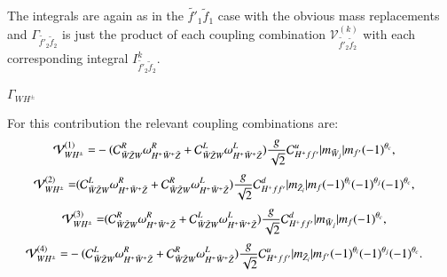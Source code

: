 \documentclass[final,3p,times,pdflatex]{elsarticle}
\begin{document}
The integrals are again as in the $\tilde{f'}_1 \tilde{f}_1$ case with the obvious mass replacements and $\Gamma_{\tilde{f'}_2 \tilde{f}_2}$ is just the product of each coupling combination $\mathcal{V}_{\tilde{f'}_2 \tilde{f}_2}^{(k)}$ with each corresponding integral $I_{\tilde{f'}_2 \tilde{f}_2}^{k}$.

\textbf{\underline{$\Gamma_{W H^{\pm}}$}}

For this contribution the relevant coupling combinations are:
\begin{equation}
\begin{aligned}
\mathcal{V}_{W H^{\pm}}^{(1)} = & -(\mathcal{C}_{\tilde{W} \tilde{Z} W}^R \omega_{H^+ \tilde{W}^+ \tilde{Z}}^R + \mathcal{C}_{\tilde{W} \tilde{Z} W}^L \omega_{H^+ \tilde{W}^+ \tilde{Z}}^L){g \over \sqrt{2}} \mathcal{C}_{H^+ f f'}^u |m_{\tilde{W}_j}|m_{f'}(-1)^{\theta_c},
\end{aligned}
\end{equation}
\begin{equation}
\begin{aligned}
\mathcal{V}_{W H^{\pm}}^{(2)} = & (\mathcal{C}_{\tilde{W} \tilde{Z} W}^L \omega_{H^+ \tilde{W}^+ \tilde{Z}}^R + \mathcal{C}_{\tilde{W} \tilde{Z} W}^R \omega_{H^+ \tilde{W}^+ \tilde{Z}}^L){g \over \sqrt{2}} \mathcal{C}_{H^+ f f'}^d |m_{\tilde{Z}_i}|m_{f} (-1)^{\theta_i}(-1)^{\theta_j}(-1)^{\theta_c},
\end{aligned}
\end{equation}
\begin{equation}
\begin{aligned}
\mathcal{V}_{W H^{\pm}}^{(3)} = & (\mathcal{C}_{\tilde{W} \tilde{Z} W}^R \omega_{H^+ \tilde{W}^+ \tilde{Z}}^R + \mathcal{C}_{\tilde{W} \tilde{Z} W}^L  \omega_{H^+ \tilde{W}^+ \tilde{Z}}^L){g \over \sqrt{2}} \mathcal{C}_{H^+ f f'}^d  |m_{\tilde{W}_j}|m_{f} (-1)^{\theta_c},
\end{aligned}
\end{equation}
\begin{equation}
\begin{aligned}
\mathcal{V}_{W H^{\pm}}^{(4)} = & -(\mathcal{C}_{\tilde{W} \tilde{Z} W}^L  \omega_{H^+ \tilde{W}^+ \tilde{Z}}^R + \mathcal{C}_{\tilde{W} \tilde{Z} W}^R  \omega_{H^+ \tilde{W}^+ \tilde{Z}}^L) {g \over \sqrt{2}} \mathcal{C}_{H^+ f f'}^u |m_{\tilde{Z}_i}| m_{f'}(-1)^{\theta_i} (-1)^{\theta_j} (-1)^{\theta_c}.
\end{aligned}
\end{equation}
\end{document}
